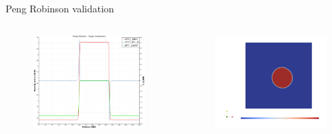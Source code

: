 \documentclass[8pt]{beamer}
\begin{document}
	\begin{frame}{Peng Robinson validation}
		\begin{columns}
			\begin{figure}
				\centering
				\includegraphics[scale=0.12]{pics/prValidation.png}
				\caption{}   
			\end{figure}
			\begin{figure}
				\centering
				\includegraphics[scale=0.15]{pics/prValidation2.png}
			\end{figure}
		\end{columns}
	\end{frame}
\end{document}
